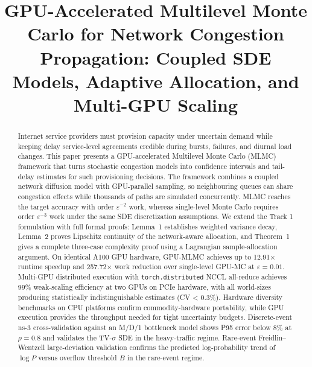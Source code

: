 \documentclass[journal]{IEEEtran}
\begin{document}
\title{GPU-Accelerated Multilevel Monte Carlo for Network Congestion Propagation: Coupled SDE Models, Adaptive Allocation, and Multi-GPU Scaling}

\author{
}

\maketitle

\begin{abstract}
Internet service providers must provision capacity under uncertain demand while keeping delay
service-level agreements credible during bursts, failures, and diurnal load changes. This paper
presents a GPU-accelerated Multilevel Monte Carlo (MLMC) framework that turns stochastic
congestion models into confidence intervals and tail-delay estimates for such provisioning
decisions. The framework combines a coupled network diffusion model with GPU-parallel sampling,
so neighbouring queues can share congestion effects while thousands of paths are simulated
concurrently. MLMC reaches the target accuracy with order $\varepsilon^{-2}$ work, whereas
single-level Monte Carlo requires order $\varepsilon^{-3}$ work under the same SDE
discretization assumptions. We extend the Track 1 formulation with full formal proofs:
Lemma~1 establishes weighted variance decay, Lemma~2 proves Lipschitz continuity of the
network-aware allocation, and Theorem~1 gives a complete three-case complexity proof using a
Lagrangian sample-allocation argument. On identical A100 GPU hardware, GPU-MLMC achieves up to
12.91$\times$ runtime speedup and 257.72$\times$ work reduction over single-level GPU-MC at
$\varepsilon=0.01$. Multi-GPU distributed execution with \texttt{torch.distributed} NCCL
all-reduce achieves 99\% weak-scaling efficiency at two GPUs on PCIe hardware, with
all world-sizes producing statistically indistinguishable estimates (CV < 0.3\%). Hardware
diversity benchmarks on CPU platforms confirm commodity-hardware portability, while GPU
execution provides the throughput needed for tight uncertainty budgets. Discrete-event ns-3
cross-validation against an M/D/1 bottleneck model shows P95 error below 8\% at
$\rho=0.8$ and validates the TV-$\sigma$ SDE in the heavy-traffic regime. Rare-event
Freidlin--Wentzell large-deviation validation confirms the predicted log-probability trend
of $\log P$ versus overflow threshold $B$ in the rare-event regime.
\end{abstract}
\end{document}
